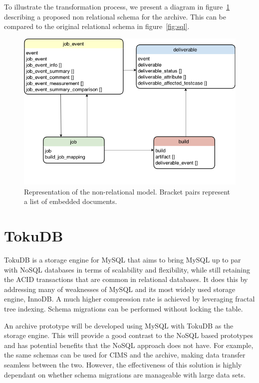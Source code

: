 To illustrate the transformation process, we present a diagram in figure~\ref{fig:nosql} describing a proposed non relational schema for the archive. This can be compared to the original relational schema in figure~\ref{fig:sql}.

\begin{figure}[h!]
\centering
\includegraphics[scale=0.5]{figure/nosql.png}
\caption{Representation of the non-relational model. Bracket pairs represent a list of embedded documents.}
\label{fig:nosql}
\end{figure}

\section{TokuDB}
TokuDB is a storage engine for MySQL that aims to bring MySQL up to par with NoSQL databases in terms of scalability and flexibility, while still retaining the ACID transactions that are common in relational databases. It does this by addressing many of weaknesses of MySQL and its most widely used storage engine, InnoDB. A much higher compression rate is achieved by leveraging fractal tree indexing. Schema migrations can be performed without locking the table.

An archive prototype will be developed using MySQL with TokuDB as the storage engine. This will provide a good contrast to the NoSQL based prototypes and has potential benefits that the NoSQL approach does not have. For example, the same schemas can be used for CIMS and the archive, making data transfer seamless between the two. However, the effectiveness of this solution is highly dependant on whether schema migrations are manageable with large data sets.

